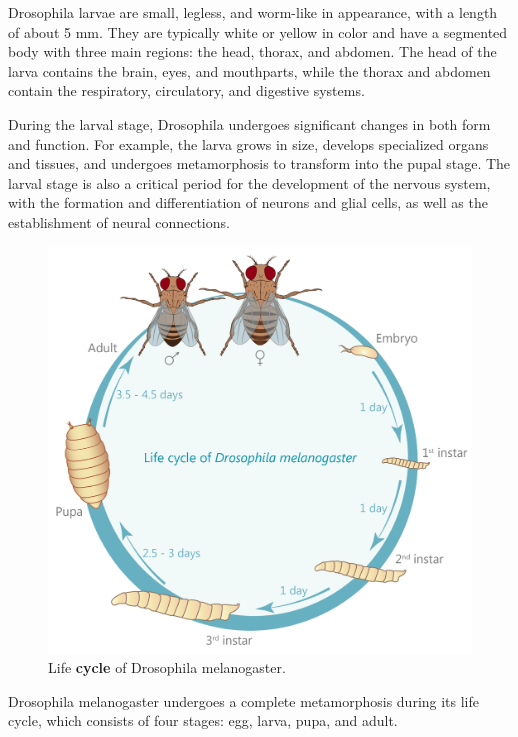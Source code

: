 \documentclass{report}
\begin{document}
	Drosophila larvae are small, legless, and worm-like in appearance, with a length of about 5 mm. They are typically white or yellow in color and have a segmented body with three main regions: the head, thorax, and abdomen. The head of the larva contains the brain, eyes, and mouthparts, while the thorax and abdomen contain the respiratory, circulatory, and digestive systems.
	
	During the larval stage, Drosophila undergoes significant changes in both form and function. For example, the larva grows in size, develops specialized organs and tissues, and undergoes metamorphosis to transform into the pupal stage. The larval stage is also a critical period for the development of the nervous system, with the formation and differentiation of neurons and glial cells, as well as the establishment of neural connections.
	
	\begin{figure}[h!]
		\centering
		\includegraphics[width=0.7\columnwidth]{resources/model_organism_fig_1.png}
		\caption{Life \textbf{cycle} of Drosophila melanogaster. \cite{example_website}}
		\label{fig:Life_cycle_of_fruit_fly}
	\end{figure}
	
	Drosophila melanogaster undergoes a complete metamorphosis during its life cycle, which consists of four stages: egg, larva, pupa, and adult.
	
\end{document}
